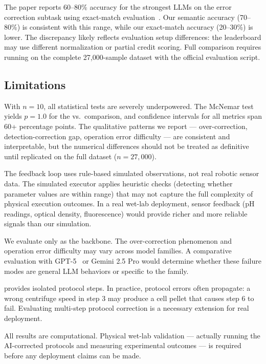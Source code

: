 The \bioprobench paper reports 60--80\% accuracy for the strongest LLMs on the error correction subtask using exact-match evaluation~\cite{bioprobench2025}.
Our semantic accuracy (70--80\%) is consistent with this range, while our exact-match accuracy (20--30\%) is lower.
The discrepancy likely reflects evaluation setup differences: the \bioprobench leaderboard may use different normalization or partial credit scoring.
Full comparison requires running on the complete 27,000-sample dataset with the official evaluation script.

\subsection{Limitations}
\label{sec:discussion:limits}

With $n=10$, all statistical tests are severely underpowered.
The McNemar test yields $p = 1.0$ for the \feedbackthree vs.\ \vanilla comparison, and confidence intervals for all metrics span 60+ percentage points.
The qualitative patterns we report --- over-correction, detection-correction gap, operation error difficulty --- are consistent and interpretable, but the numerical differences should not be treated as definitive until replicated on the full \bioprobench dataset ($n = 27{,}000$).

The feedback loop uses rule-based simulated observations, not real robotic sensor data.
The simulated executor applies heuristic checks (\eg detecting whether parameter values are within range) that may not capture the full complexity of physical execution outcomes.
In a real wet-lab deployment, sensor feedback (pH readings, optical density, fluorescence) would provide richer and more reliable signals than our simulation.

We evaluate only \claude as the backbone.
The over-correction phenomenon and operation error difficulty may vary across model families.
A comparative evaluation with GPT-5~\cite{openai2025gpt5} or Gemini 2.5 Pro would determine whether these failure modes are general LLM behaviors or specific to the \claude family.

\bioprobench provides isolated protocol steps.
In practice, protocol errors often propagate: a wrong centrifuge speed in step 3 may produce a cell pellet that causes step 6 to fail.
Evaluating multi-step protocol correction is a necessary extension for real deployment.

All results are computational.
Physical wet-lab validation --- actually running the AI-corrected protocols and measuring experimental outcomes --- is required before any deployment claims can be made.
